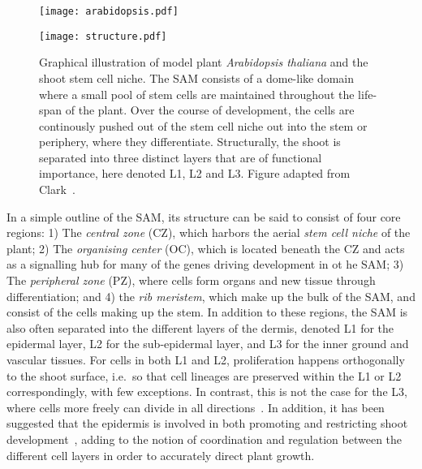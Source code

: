 \begin{figure}[H]
  \centering
  \begin{minipage}{0.25\textwidth}
    \centering
    \texttt{[image: arabidopsis.pdf]}
  \end{minipage}\hfill
  \begin{minipage}{.75\textwidth}
    \centering
    \texttt{[image: structure.pdf]} %
  \end{minipage}
  \caption[Graphical illustration of \textit{Arabidopsis thaliana} and the
  \textit{Shoot Apical Meristem}]{Graphical illustration of model plant \textit{Arabidopsis
      thaliana} and the shoot stem cell niche. The SAM consists of a
    dome-like domain where a small pool of stem cells are maintained
    throughout the life-span of the plant. Over the course of development,
    the cells are continously pushed out of the stem cell niche out into the
    stem or periphery, where they differentiate. Structurally, the shoot is
    separated into three distinct layers that are of functional
    importance, here denoted L1, L2 and L3. Figure adapted from
    Clark~\cite{clark2001cell}.}
\end{figure}

In a simple outline of the SAM, its structure can be said to consist of four core regions:
1) The \textit{central zone} (CZ), which harbors the aerial \textit{stem cell niche} 
of the plant; 2) The \textit{organising center} (OC), which is located beneath
the CZ and acts as a signalling hub for many of the genes driving development in
ot he SAM; 3) The
\textit{peripheral zone} (PZ), where cells form organs and new tissue through
differentiation; and 4) the \textit{rib meristem}, which make up the bulk of the
SAM, and consist of the cells making up the stem. In addition to these regions,
the SAM is also often separated 
into the different layers of the dermis, denoted L1 for the epidermal
layer, L2 for the sub-epidermal layer, and L3 for the inner ground
and vascular tissues. For cells in both L1 and L2, proliferation happens
orthogonally to the shoot surface, i.e.\ so that cell lineages are preserved
within the L1 or L2 correspondingly, with few exceptions. In contrast,
this is not the case for the L3, where 
cells more freely can divide in all directions~\cite{scheres2007stem}. In
addition, it has been suggested
that the epidermis is involved in both promoting and restricting shoot
development~\cite{gruel2016epidermis}, adding to the
notion of coordination and regulation between the different cell layers in order
to accurately direct plant growth. 

